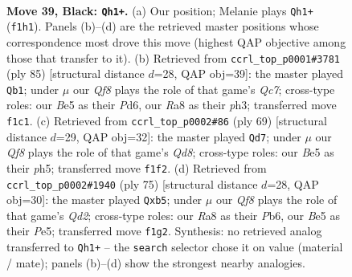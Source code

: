 \documentclass[11pt]{article}
\begin{document}
\clearpage

\begin{figure}[p]\centering
\begin{subfigure}{0.46\textwidth}\centering
\resizebox{\linewidth}{!}{%
\newchessgame
\chessboard[
  setfen={r7/p6Q/2k1p3/p2pb3/6PK/3P4/8/5q2 b - - 2 39},
  showmover=false,
  pgfstyle=straightmove, color=movearrow, markmove={f1-h1}
]}
\caption{}
\end{subfigure}\hfill
\begin{subfigure}{0.46\textwidth}\centering
\resizebox{\linewidth}{!}{%
\newchessgame
\chessboard[
  setfen={6Q1/1p6/2pp1k2/5p2/P1P5/4P1KP/2q5/8 b - - 6 43},
  showmover=false,
  pgfstyle=straightmove, color=movearrow, markmove={c2-b1}
]}
\caption{}
\end{subfigure}
\\[4pt]
\begin{subfigure}{0.46\textwidth}\centering
\resizebox{\linewidth}{!}{%
\newchessgame
\chessboard[
  setfen={7k/1p4p1/1p5p/7P/P3Q1P1/8/5PK1/3q4 b - - 5 35},
  showmover=false,
  pgfstyle=straightmove, color=movearrow, markmove={d1-d7}
]}
\caption{}
\end{subfigure}\hfill
\begin{subfigure}{0.46\textwidth}\centering
\resizebox{\linewidth}{!}{%
\newchessgame
\chessboard[
  setfen={6k1/3q3p/1p4p1/1Pp1p3/4N3/5Q2/7P/7K b - - 0 38},
  showmover=false,
  pgfstyle=straightmove, color=movearrow, markmove={d7-b5}
]}
\caption{}
\end{subfigure}
\caption{\textbf{Move 39, Black: \texttt{Qh1+}.} (a) Our position; Melanie plays \texttt{Qh1+} (\texttt{f1h1}). Panels (b)--(d) are the retrieved master positions whose correspondence most drove this move (highest QAP objective among those that transfer to it). (b) Retrieved from \texttt{ccrl\_top\_p0001\#3781} (ply 85) [structural distance $d$=28, QAP obj=39]: the master played \texttt{Qb1}; under $\mu$ our \emph{Qf8} plays the role of that game's \emph{Qc7}; cross-type roles: our \emph{B}e5 as their \emph{P}d6, our \emph{R}a8 as their \emph{p}h3; transferred move \texttt{f1c1}. (c) Retrieved from \texttt{ccrl\_top\_p0002\#86} (ply 69) [structural distance $d$=29, QAP obj=32]: the master played \texttt{Qd7}; under $\mu$ our \emph{Qf8} plays the role of that game's \emph{Qd8}; cross-type roles: our \emph{B}e5 as their \emph{p}h5; transferred move \texttt{f1f2}. (d) Retrieved from \texttt{ccrl\_top\_p0002\#1940} (ply 75) [structural distance $d$=28, QAP obj=30]: the master played \texttt{Qxb5}; under $\mu$ our \emph{Qf8} plays the role of that game's \emph{Qd2}; cross-type roles: our \emph{R}a8 as their \emph{P}b6, our \emph{B}e5 as their \emph{P}e5; transferred move \texttt{f1g2}. Synthesis: no retrieved analog transferred to \texttt{Qh1+} -- the \texttt{search} selector chose it on value (material / mate); panels (b)--(d) show the strongest nearby analogies.}
\label{fig:thought-m77}
\end{figure}
\end{document}

